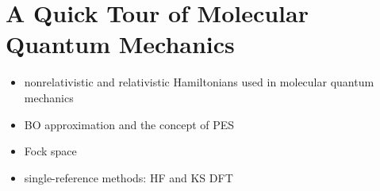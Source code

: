
\renewcommand{\thefigure}{\arabic{chapter}.\arabic{figure}}

\chapter{A Quick Tour of Molecular Quantum Mechanics}\label{ch:QM}

\begin{itemize}
  \item nonrelativistic and relativistic Hamiltonians used in molecular
    quantum mechanics
  \item \ac{BO} approximation and the concept of \ac{PES}
  \item Fock space
  \item single-reference methods: \ac{HF} and \ac{KS} \ac{DFT}
\end{itemize}

